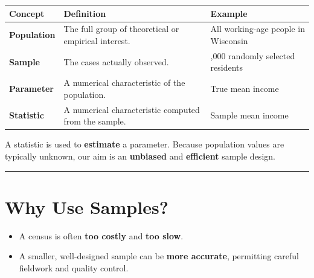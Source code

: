 \documentclass[
  letterpaper,
  DIV=11,
  numbers=noendperiod]{scrreprt}
\providecommand{\tightlist}{%
  \setlength{\itemsep}{0pt}\setlength{\parskip}{0pt}}
\begin{document}
\begin{longtable}[]{@{}
  >{\raggedright\arraybackslash}p{}
  >{\raggedright\arraybackslash}p{}
  >{\raggedright\arraybackslash}p{}@{}}
\toprule\noalign{}
\begin{minipage}[b]{\linewidth}\raggedright
\textbf{Concept}
\end{minipage} & \begin{minipage}[b]{\linewidth}\raggedright
\textbf{Definition}
\end{minipage} & \begin{minipage}[b]{\linewidth}\raggedright
\textbf{Example}
\end{minipage} \\
\midrule\noalign{}
\endhead
\bottomrule\noalign{}
\endlastfoot
\textbf{Population} & The full group of theoretical or empirical
interest. & All working-age people in Wisconsin \\
\textbf{Sample} & The cases actually observed. & 1,000 randomly selected
residents \\
\textbf{Parameter} & A numerical characteristic of the population. &
True mean income \\
\textbf{Statistic} & A numerical characteristic computed from the
sample. & Sample mean income \\
\end{longtable}

A statistic is used to \textbf{estimate} a parameter. Because population
values are typically unknown, our aim is an \textbf{unbiased} and
\textbf{efficient} sample design.

\begin{center}\rule{0.5\linewidth}{0.5pt}\end{center}

\section{Why Use Samples?}\label{why-use-samples}

\begin{itemize}
\tightlist
\item
  A census is often \textbf{too costly} and \textbf{too slow}.\\
\item
  A smaller, well-designed sample can be \textbf{more accurate},
  permitting careful fieldwork and quality control.
\end{itemize}
\end{document}
